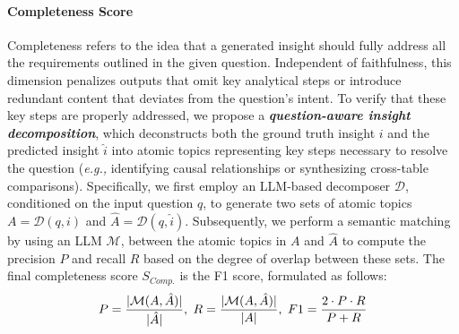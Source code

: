 \paragraph{Completeness Score}
Completeness refers to the idea that a generated insight should fully address all the requirements outlined in the given question.
Independent of faithfulness, this dimension penalizes outputs that omit key analytical steps or introduce redundant content that deviates from the question’s intent.
To verify that these key steps are properly addressed, we propose a \textbf{\textit{question-aware insight decomposition}}, which deconstructs both the ground truth insight $i$ and the predicted insight $\hat{i}$ into atomic topics representing key steps necessary to resolve the question (\textit{e.g.,} identifying causal relationships or synthesizing cross-table comparisons). 
Specifically, we first employ an LLM-based decomposer $\mathcal{D}$, conditioned on the input question $q$, to generate two sets of atomic topics $A = \mathcal{D}(q, i)$ and $\hat{A} = \mathcal{D}(q, \hat{i})$. 
Subsequently, we perform a semantic matching by using an LLM $\mathcal{M}$, between the atomic topics in $A$ and $\hat{A}$ to compute the precision $P$ and recall $R$ based on the degree of overlap between these sets.   
The final completeness score $S_{Comp.}$ is the F1 score, formulated as follows:
\begin{equation}
\small 
    P = \frac{|\mathcal{M}(A, \hat{A})|}{|\hat{A}|}, \   
    R = \frac{|\mathcal{M}(A, \hat{A})|}{|A|}, \   
    F1 = \frac{2 \cdot P \cdot R}{P + R} 
\end{equation}